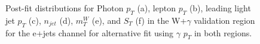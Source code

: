 \begin{figure}[]
\hfil  
{}
\caption{Post-fit distributions for Photon $p_T$ (a), lepton $p_T$ (b), leading light jet $p_T$ (c), $n_{jet}$ (d), $m_T^W$ (e), and $S_T$ (f) in the W+$\gamma$ validation region for the e+jets channel for alternative fit using  $\gamma$ $p_T$ in both regions. }
\end{figure}


